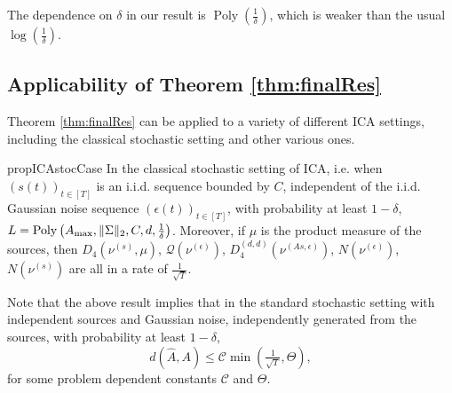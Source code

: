 \documentclass[11pt]{article}
\newcommand{\iid}{i.i.d.\xspace}
\DeclareMathOperator{\pol}{Poly}
\newcommand{\poly}[1]{\pol\left(#1\right)}
\newcommand{\cQ}{\mathcal{Q}}
\newcommand{\eps}{\epsilon}
\begin{document}
\begin{remark}
	The dependence on $\delta$ in our result is $\poly{\frac{1}{\delta}}$, which is weaker than the usual $\log(\frac{1}{\delta})$.
\end{remark}

\subsection{Applicability of Theorem \ref{thm:finalRes}}
\label{subsec:ICAapplytheorem}
Theorem \ref{thm:finalRes} can be applied to a variety of different ICA settings, including the classical stochastic setting and other various ones.
\begin{restatable}{prop}{ICAstocCase}
	\label{prop:stochasticAss}
	In the classical stochastic setting of ICA, i.e. when $(s(t))_{t\in[T]}$ is an \iid sequence bounded by $C$, independent of the \iid Gaussian noise sequence $(\epsilon(t))_{t\in[T]}$, with probability at least $1-\delta$, $L = \poly{A_{\rm max}, \|\Sigma\|_2,C,d,\frac{1}{\delta}}$.
	Moreover, if $\mu$ is the product measure of the sources, then $D_4(\nu^{(s)},\mu)$, $\cQ(\nu^{(\eps)})$, $D_4^{(d,d)}(\nu^{(As,\eps)})$, $N(\nu^{(\eps)})$, $N(\nu^{(s)})$ are all in a rate of $\frac{1}{\sqrt{T}}$.
\end{restatable}

Note that the above result implies that in the standard stochastic setting
with independent sources and Gaussian noise, independently generated from the sources, 
with probability at least $1-\delta$,
\[
d(\hat{A}, A) \le \mathcal{C} \min\left(\tfrac{1}{\sqrt{T}}, \Theta \right),
\]
for some problem dependent constants $\mathcal{C}$ and $\Theta$.
\end{document}
